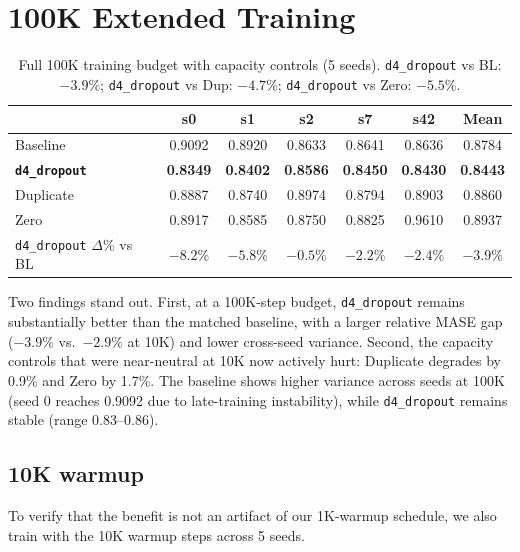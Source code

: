 \documentclass{article}
\begin{document}
\section{100K Extended Training}
\label{app:100k}

\begin{table}[H]
\centering
\caption{Full 100K training budget with capacity controls (5 seeds). \texttt{d4\_dropout} vs BL: $-3.9\%$; \texttt{d4\_dropout} vs Dup: $-4.7\%$; \texttt{d4\_dropout} vs Zero: $-5.5\%$.}
\small
\begin{tabular}{lcccccc}
\toprule
& \textbf{s0} & \textbf{s1} & \textbf{s2} & \textbf{s7} & \textbf{s42} & \textbf{Mean} \\
\midrule
Baseline & 0.9092 & 0.8920 & 0.8633 & 0.8641 & 0.8636 & 0.8784 \\
\textbf{\texttt{d4\_dropout}} & \textbf{0.8349} & \textbf{0.8402} & \textbf{0.8586} & \textbf{0.8450} & \textbf{0.8430} & \textbf{0.8443} \\
Duplicate & 0.8887 & 0.8740 & 0.8974 & 0.8794 & 0.8903 & 0.8860 \\
Zero & 0.8917 & 0.8585 & 0.8750 & 0.8825 & 0.9610 & 0.8937 \\
\midrule
\texttt{d4\_dropout} $\Delta$\% vs BL & $-8.2\%$ & $-5.8\%$ & $-0.5\%$ & $-2.2\%$ & $-2.4\%$ & $-3.9\%$ \\
\bottomrule
\end{tabular}
\end{table}

Two findings stand out. First, at a 100K-step budget, \texttt{d4\_dropout} remains substantially better than the matched baseline, with a larger relative MASE gap ($-3.9\%$ vs.\ $-2.9\%$ at 10K) and lower cross-seed variance. Second, the capacity controls that were near-neutral at 10K now actively hurt: Duplicate degrades by 0.9\% and Zero by 1.7\%. The baseline shows higher variance across seeds at 100K (seed 0 reaches 0.9092 due to late-training instability), while \texttt{d4\_dropout} remains stable (range 0.83--0.86).

\subsection{10K warmup}

To verify that the benefit is not an artifact of our 1K-warmup schedule, we also train with the 10K warmup steps across 5 seeds.
\end{document}
